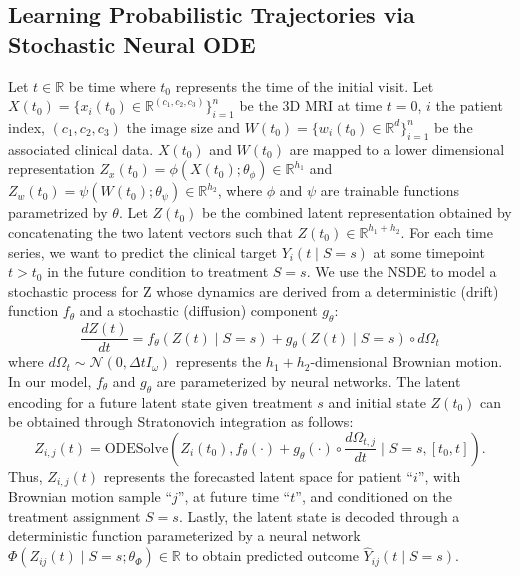 \documentclass[runningheads]{llncs}
\begin{document}
\subsection{Learning Probabilistic Trajectories via Stochastic Neural ODE}
Let $t \in \mathbb{R}$ be time where $t_0$ represents the time of the initial visit. Let $X(t_0) = \{ x_i(t_0) \in \mathbb{R}^{(c_1,c_2,c_3)} \}_{i=1}^n$ be the 3D MRI at time $t=0$, $i$ the patient index, $(c_1,c_2,c_3)$ the image size and $W(t_0) = \{ w_i(t_0) \in \mathbb{R}^{d} \}_{i=1}^n$ be the associated clinical data. $X(t_0)$ and $W(t_0)$ are mapped to a lower dimensional representation $Z_x(t_0) = \phi(X(t_0);\theta_\phi) \in \mathbb{R}^{h_1}$ and $Z_w(t_0) = \psi(W(t_0);\theta_\psi) \in \mathbb{R}^{h_2}$, where $\phi$ and $\psi$ are trainable functions parametrized by $\theta$. Let $Z(t_0)$ be the combined latent representation obtained by concatenating the two latent vectors such that $Z(t_0) \in \mathbb{R}^{h_1+h_2}$. For each time series, we want to predict the clinical target $Y_i(t \mid S=s)$ at some timepoint $t > t_0$ in the future condition to treatment $S=s$. We use the NSDE to model a stochastic process for Z whose dynamics are derived from a deterministic (drift) function $f_\theta$ and a stochastic (diffusion) component $g_\theta$:
 \begin{equation}
    \frac{dZ(t)}{dt} = f_\theta\left(Z(t) \mid S=s\right) + g_\theta \left(Z(t) \mid S=s\right) \circ d\Omega_t
\end{equation}
\noindent where $d\Omega_t \sim \mathcal{N}(0,\Delta t I_\omega)$ represents the $h_1+h_2$-dimensional Brownian motion. In our model, $f_\theta$ and $g_\theta$ are parameterized by neural networks. The latent encoding for a future latent state given treatment $s$ and initial state $Z(t_0)$ can be obtained through Stratonovich integration \cite{Kidger2021} as follows:
\begin{equation}
    Z_{i,j}(t) = \text{ODESolve}(Z_{i}(t_{0}),f_\theta(\cdot) + g_\theta(\cdot) \circ \frac{d\Omega_{t,j}}{dt} \mid S=s, [t_0,t]).
\end{equation}
\noindent Thus, $Z_{i,j}(t)$ represents the forecasted latent space for patient “$i$”, with Brownian motion sample “$j$”, at future time “$t$”, and conditioned on the treatment assignment $S=s$. Lastly, the latent state is decoded through a deterministic function parameterized by a neural network $\Phi(Z_{ij}(t) \mid S=s ; \theta_{\Phi}) \in \mathbb{R}$ to obtain predicted outcome $\hat{Y}_{ij}(t \mid S=s)$. 
\end{document}
